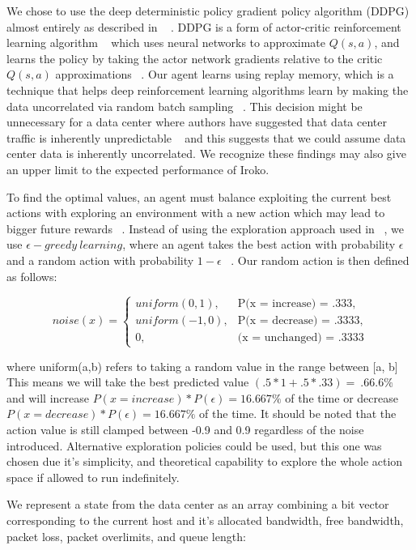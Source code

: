 We chose to use the deep deterministic policy gradient policy algorithm (DDPG) almost entirely as described in ~\cite{DDPG} . DDPG is a form of actor-critic reinforcement learning algorithm ~\cite{Sutton:1998:IRL:551283} which uses neural networks to approximate $Q(s,a)$, and learns the policy by taking the actor network gradients relative to the critic $Q(s,a)$ approximations ~\cite{DDPG}.  Our agent learns using replay memory, which is a technique that helps deep reinforcement learning algorithms learn by making the data uncorrelated via random batch sampling ~\cite{DQLearning}. This decision might be unnecessary for a data center where authors have suggested that data center traffic is inherently unpredictable ~\cite{microte} and this suggests that we could assume data center data is inherently uncorrelated. We recognize these findings may also give an upper limit to the expected performance of Iroko. 

To find the optimal values, an agent must balance exploiting the current best actions with exploring an environment with a new action which may lead to bigger future rewards ~\cite{Sutton:1998:IRL:551283}. Instead of using the exploration approach used in ~\cite{DDPG}, we use $\epsilon-greedy\ learning$, where an agent takes the best action with probability $\epsilon$ and a random action with probability $1 - \epsilon$ ~\cite{Sutton:1998:IRL:551283}. Our random action is then defined as follows:

\[
noise(x) = 
\begin{cases}

uniform(0,1), &\text{P(x = increase) = .333},\\
uniform(-1,0), &\text{P(x = decrease) = .3333},\\
0, & \text{(x = unchanged) = .3333}
\end{cases}
\]

where uniform(a,b) refers to taking a random value in the range between [a, b]
This means we will take the best predicted value $(.5 * 1 + .5 * .33) =  ~.66.6\%$  and will increase $P(x= increase) * P(\epsilon) = 16. 667\%$ of the time or decrease $P(x= decrease) * P(\epsilon) = 16. 667\%$ of the time. It should be noted that the action value is still clamped between -0.9 and 0.9 regardless of the noise introduced. Alternative exploration policies could be used, but this one was chosen due it’s simplicity, and theoretical capability to explore the whole action space if allowed to run indefinitely.

We represent a state from the data center as an array combining a bit vector corresponding to the current host and it's allocated bandwidth, free bandwidth, packet loss, packet overlimits, and queue length:

